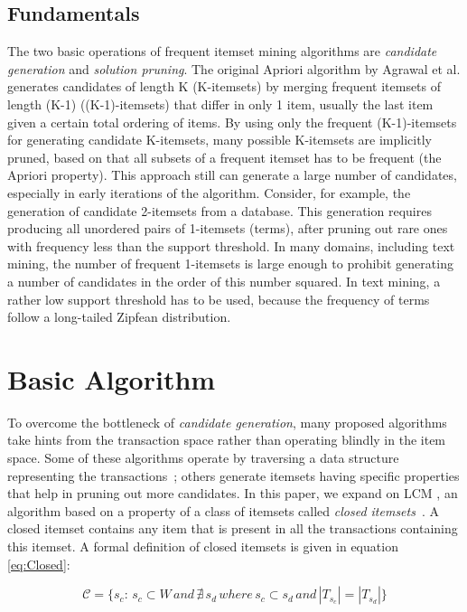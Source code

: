 \documentclass{sig-alternate}
\begin{document}
\subsection{Fundamentals}

The two basic operations of frequent itemset mining algorithms are
\emph{candidate generation} and \emph{solution pruning}.
The original Apriori algorithm by Agrawal et al. \cite{agrawal1994fast}
generates candidates of length K (K-itemsets) by merging frequent itemsets of
length (K-1) ((K-1)-itemsets) that differ in only 1 item, usually the last
item given a certain total ordering of items.
By using only the frequent  (K-1)-itemsets for generating candidate K-itemsets,
many possible K-itemsets are implicitly pruned, based on that all subsets of a
frequent itemset has to be frequent (the Apriori property).
This approach still can generate a large number of candidates, especially
in early iterations of the algorithm.
Consider, for example, the generation of candidate 2-itemsets from a database.
This generation requires producing all unordered pairs of 1-itemsets (terms),
after pruning out rare ones with frequency less than the support threshold.
In many domains, including text mining, the number of frequent 1-itemsets is
large enough to prohibit generating a number of candidates in the order of this
number squared.
In text mining, a rather low support threshold has to be used, because the
frequency of terms follow a long-tailed Zipfean distribution.

\section{Basic Algorithm}
\label{sec:lcm}
To overcome the bottleneck of \emph{candidate generation}, many proposed
algorithms take hints from the transaction space rather than operating blindly
in the item space.
Some of these algorithms operate by traversing a data structure representing
the transactions~\cite{han2000mining}; others generate itemsets having
specific properties that help in pruning out more candidates.
In this paper, we expand on LCM \cite{uno2004lcm}, an algorithm based on a
property of a class of itemsets called
\emph{closed itemsets}~\cite{pasquier1999discovering}.
A closed itemset contains any item that is present in all the transactions
containing this itemset.
A formal definition of closed itemsets is given in equation \ref{eq:Closed}: 

\begin{equation}\label{eq:Closed}\mathcal{C} = \{s_c:\, s_c \subset W \, and \,\nexists \, s_d \, where \, s_c  \subset s_d \, and \, |T_{s_c}| = |T_{s_d}|\}\end{equation}
\end{document}
